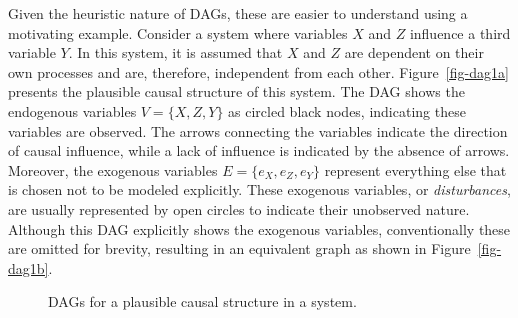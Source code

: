 \documentclass[
  authoryear,
  preprint,
  1p]{elsarticle}
\begin{document}
Given the heuristic nature of DAGs, these are easier to understand using
a motivating example. Consider a system where variables \(X\) and \(Z\)
influence a third variable \(Y\). In this system, it is assumed that
\(X\) and \(Z\) are dependent on their own processes and are, therefore,
independent from each other. Figure~\ref{fig-dag1a} presents the
plausible causal structure of this system. The DAG shows the endogenous
variables \(V=\{X,Z,Y\}\) as circled black nodes, indicating these
variables are observed. The arrows connecting the variables indicate the
direction of causal influence, while a lack of influence is indicated by
the absence of arrows. Moreover, the exogenous variables
\(E=\{e_{X},e_{Z},e_{Y}\}\) represent everything else that is chosen not
to be modeled explicitly. These exogenous variables, or
\emph{disturbances}, are usually represented by open circles to indicate
their unobserved nature. Although this DAG explicitly shows the
exogenous variables, conventionally these are omitted for brevity,
resulting in an equivalent graph as shown in Figure~\ref{fig-dag1b}.

\begin{figure}

\begin{minipage}{0.50\linewidth}



\end{minipage}%
%
\begin{minipage}{0.50\linewidth}



\end{minipage}%

\caption{\label{fig-dags}DAGs for a plausible causal structure in a
system.}

\end{figure}%
\end{document}
